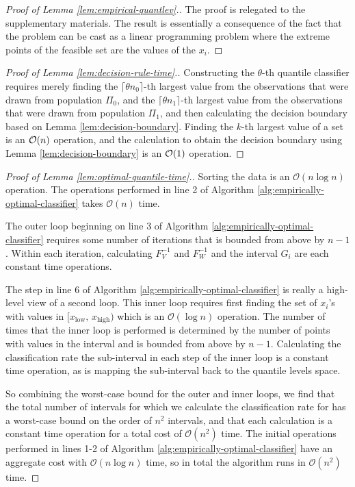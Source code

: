 \begin{proof}[Proof of Lemma \ref{lem:empirical-quantlev}.]
  The proof is relegated to the supplementary materials.  The result is
  essentially a consequence of the fact that the problem can be cast as a linear
  programming problem where the extreme points of the feasible set are the
  values of the $x_i$.
\end{proof}

\begin{proof}[Proof of Lemma \ref{lem:decision-rule-time}.]
  Constructing the $\theta$-th quantile classifier requires merely finding the
  $\lceil \theta n_0 \rceil$-th largest value from the observations that were
  drawn from population $\Pi_0$, and the $\lceil \theta n_1 \rceil$-th largest
  value from the observations that were drawn from population $\Pi_1$, and then
  calculating the decision boundary based on Lemma \ref{lem:decision-boundary}.
  Finding the $k$-th largest value of a set is an $\mathcal{O}(n)$ operation, and the
  calculation to obtain the decision boundary using Lemma
  \ref{lem:decision-boundary} is an $\mathcal{O}(1)$ operation.
\end{proof}

\begin{proof}[Proof of Lemma \ref{lem:optimal-quantile-time}.]
  Sorting the data is an $\mathcal{O}(n \log n)$ operation.  The operations
  performed in line 2 of Algorithm \ref{alg:empirically-optimal-classifier}
  takes $\mathcal{O}(n)$ time.

  The outer loop beginning on line 3 of Algorithm
  \ref{alg:empirically-optimal-classifier} requires some number of iterations
  that is bounded from above by $n - 1$.  Within each iteration, calculating
  $F_V^{-1}$ and $F_W^{-1}$ and the interval $G_i$ are each constant time
  operations.

  The step in line 6 of Algorithm \ref{alg:empirically-optimal-classifier} is
  really a high-level view of a second loop.  This inner loop requires first
  finding the set of $x_i$'s with values in
  $\big[x_{\scriptscriptstyle\text{low}},\,
  x_{\scriptscriptstyle\text{high}}\big)$ which is an $\mathcal{O}(\log n)$
  operation.  The number of times that the inner loop is performed is determined
  by the number of points with values in the interval and is bounded from above
  by $n - 1$.  Calculating the classification rate the sub-interval in each step
  of the inner loop is a constant time operation, as is mapping the sub-interval
  back to the quantile levels space.

  So combining the worst-case bound for the outer and inner loops, we find that
  the total number of intervals for which we calculate the classification rate
  for has a worst-case bound on the order of $n^2$ intervals, and that each
  calculation is a constant time operation for a total cost of
  $\mathcal{O}(n^2)$ time.  The initial operations performed in lines 1-2 of
  Algorithm \ref{alg:empirically-optimal-classifier} have an aggregate cost with
  $\mathcal{O}(n \log n)$ time, so in total the algorithm runs in
  $\mathcal{O}(n^2)$ time.
\end{proof}

